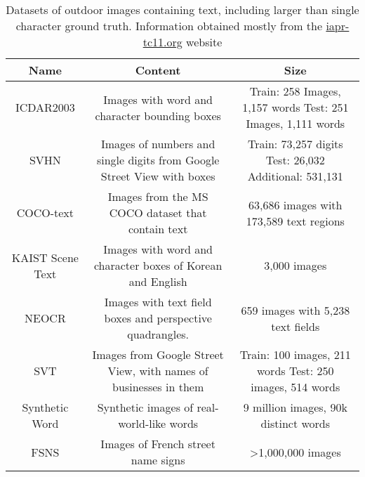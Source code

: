 \documentclass[runningheads]{llncs}
\begin{document}
\begin{table}
\begin{center}
\caption{Datasets of outdoor images containing text, including larger than single character ground truth. Information obtained mostly from the \href{http://www.iapr-tc11.org/mediawiki/index.php/Datasets}{iapr-tc11.org} website}
\label{table:datasets}
{\scriptsize
\begin{tabulary}{\linewidth}{ | C | C | C |}
\hline
Name & Content & Size \\ \hline \hline 
ICDAR2003 \cite{lucas2005icdar} & Images with word and character bounding boxes & Train: 258 Images, 1,157 words Test: 251 Images, 1,111 words \\ \hline
SVHN \cite{netzer2011reading} & Images of numbers and single digits from Google Street View with boxes & Train: 73,257 digits Test: 26,032 Additional: 531,131 \\ \hline
COCO-text \cite{veit2016coco} & Images from the MS COCO dataset that contain text & 63,686 images with 173,589 text regions \\ \hline
KAIST \cite{jung2011touch} Scene Text & Images with word and character boxes of Korean and English & 3,000 images\\ \hline 
NEOCR \cite{nagy2011neocr} & Images with text field boxes and perspective quadrangles. & 659 images with 5,238 text fields\\ \hline 
SVT \cite{wang2011end} & Images from Google Street View, with names of businesses in them & Train: 100 images, 211 words Test: 250 images, 514 words \\ \hline
Synthetic Word \cite{Jaderberg14c} & Synthetic images of real-world-like words & 9 million images, 90k distinct words \\ \hline
FSNS & Images of French street name signs & \textgreater 1,000,000 images \\ \hline
\end{tabulary}
}
\end{center}
\end{table}
\end{document}
